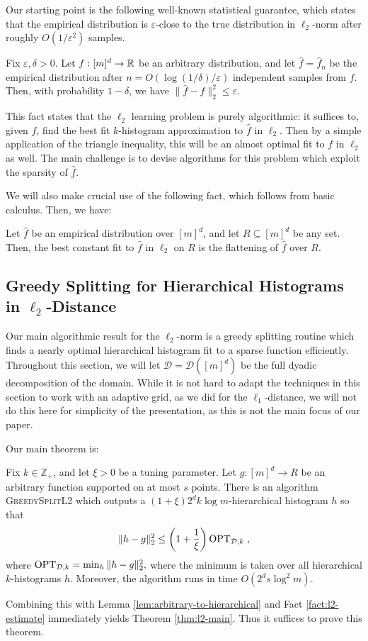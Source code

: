 \documentclass[final,12pt]{colt2018} %
\newcommand{\eps}{\varepsilon}
\newcommand{\hier}{\mathcal{D}}
\newcommand{\fhat}{\widehat{f}}
\begin{document}
Our starting point is the following well-known statistical guarantee, 
which states that the empirical distribution is $\eps$-close to the true distribution 
in $\ell_2$-norm after roughly $O(1 / \eps^2)$ samples. 
\begin{fact}
\label{fact:l2-estimate}
Fix $\eps, \delta > 0$.
Let $f: [m]^d \to \operatorname{\mathbb{R}}$ be an arbitrary distribution, and let $\fhat = \fhat_n$ 
be the empirical distribution after $n = O (\log (1 / \delta) / \eps)$ independent samples from $f$.
Then, with probability $1 - \delta$, we have $\| \fhat - f \|_2^2 \leq \eps$.
\end{fact}

This fact states that the $\ell_2$ learning problem is purely algorithmic: it suffices to, given $\fhat$, find the best fit $k$-histogram approximation to $\fhat$ in $\ell_2$.
Then by a simple application of the triangle inequality, this will be an almost optimal fit to $f$ in $\ell_2$ as well.
The main challenge is to devise algorithms for this problem which exploit the sparsity of $\fhat$.

We will also make crucial use of the following fact, which follows from basic calculus.
Then, we have:
\begin{fact}[folklore]
\label{fact:mean}
Let $\fhat$ be an empirical distribution over $[m]^d$, and let $R \subseteq [m]^d$ be any set.
Then, the best constant fit to $\fhat$ in $\ell_2$ on $R$ is the flattening of $\fhat$ over $R$.
\end{fact}

\subsection{Greedy Splitting for Hierarchical Histograms in $\ell_2$-Distance}
Our main algorithmic result for the $\ell_2$-norm 
is a greedy splitting routine which finds a nearly optimal hierarchical histogram fit to a sparse function efficiently.
Throughout this section, we will let $\hier = \hier ([m]^d)$ be the full dyadic decomposition of the domain.
While it is not hard to adapt the techniques in this section to work with an adaptive grid, 
as we did for the $\ell_1$-distance, we will not do this here for simplicity of the presentation, 
as this is not the main focus of our paper.

Our main theorem is:
\begin{theorem}
\label{thm:splitting-l2}
Fix $k \in \mathbb{Z}_+$, and let $\xi > 0$ be a tuning parameter.
Let $g: [m]^d \to R$ be an arbitrary function supported on at most $s$ points.
There is an algorithm \textsc{GreedySplitL2} which outputs a $(1 + \xi) 2^d k \log m$-hierarchical histogram $h$ so that
\[
\| h - g \|_2^2 \leq  \left( 1 + \frac{1}{\xi} \right) \OPT_{\hier, k} \; ,
\]
where
$
\OPT_{\hier, k} = \min_{h} \| h - g \|_{2}^2,
$
where the minimum is taken over all hierarchical $k$-histograms $h$.
Moreover, the algorithm runs in time $O (2^d s \log^2 m)$.
\end{theorem}
\noindent
Combining this with Lemma \ref{lem:arbitrary-to-hierarchical} and Fact \ref{fact:l2-estimate} immediately yields Theorem \ref{thm:l2-main}.
Thus it suffices to prove this theorem.
\end{document}
